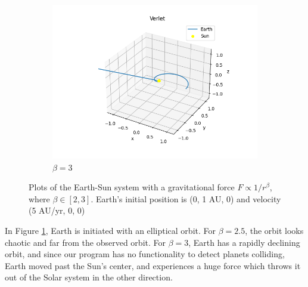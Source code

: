 \begin{figure}[H]
\begin{subfigure}{0.48\linewidth}
			\includegraphics[width=1.15\linewidth]{Figure/Verlet_elliptical_B300.png}
			\caption{$\beta = 3$}
		\end{subfigure}
		\caption{Plots of the Earth-Sun system with a gravitational force $F \propto 1/r^{\beta}$, where $\beta\in[2,3]$. Earth's initial position is (0, 1 AU, 0) and velocity (5 AU/yr, 0, 0)}
		\label{betaelliptical}
	\end{figure}
	
	In Figure \ref{betaelliptical}, Earth is initiated with an elliptical orbit. For $\beta = 2.5$, the orbit looks chaotic and far from the observed orbit. For $\beta = 3$, Earth has a rapidly declining orbit, and since our program has no functionality to detect planets colliding, Earth moved past the Sun's center, and experiences a huge force which throws it out of the Solar system in the other direction. 
	

